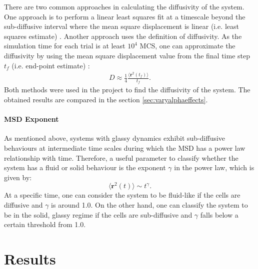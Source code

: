 \documentclass[a4paper,12pt]{article}
\begin{document}
There are two common approaches in calculating the diffusivity of the system. One approach is to perform a linear least squares fit at a timescale beyond the sub-diffusive interval where the mean square displacement is linear (i.e. least squares estimate) \cite{michalet2010}. Another approach uses the definition of diffusivity. As the simulation time for each trial is at least $10^4$ MCS, one can approximate the diffusivity by using the mean square displacement value from the final time step $t_f$ (i.e. end-point estimate) \cite{bi2015motility}:
\begin{eqnarray}
D \approx \frac{1}{4} \frac{\langle{\bm{r}^2(t_f)\rangle}}{t_f}.
\end{eqnarray}
Both methods were used in the project to find the diffusivity of the system. The obtained results are compared in the section \ref{sec:varyalphaeffects}.

\paragraph{MSD Exponent}
As mentioned above, systems with glassy dynamics exhibit sub-diffusive behaviours at intermediate time scales during which the MSD has a power law relationship with time. Therefore, a useful parameter to classify whether the system has a fluid or solid behaviour is the exponent $\gamma$ in the power law, which is given by:
\begin{equation}
\langle\bm{r}^2(t)\rangle \sim t^{\gamma}.
\end{equation}
At a specific time, one can consider the system to be fluid-like if the cells are diffusive and $\gamma$ is around 1.0. On the other hand, one can classify the system to be in the solid, glassy regime if the cells are sub-diffusive and $\gamma$ falls below a certain threshold from 1.0.

\section{Results}
\end{document}
